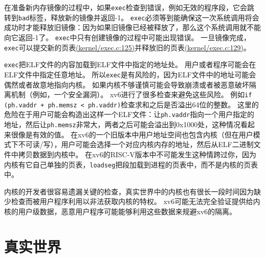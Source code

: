 在准备新内存镜像的过程中，如果\texttt{exec}检查到错误，例如无效的程序段，它会跳转到\texttt{bad}标签，释放新的镜像并返回-1。
\texttt{exec}必须等到能确保这一次系统调用将会成功时才能释放旧镜像：因为如果旧镜像已经被释放了，那么这个系统调用就不能向它返回-1了。
\texttt{exec}中只有创建镜像的过程中可能出现错误。
一旦镜像完成，\texttt{exec}可以提交新的页表\href{https://github.com/mit-pdos/xv6-riscv/blob/riscv//kernel/exec.c#L125}{(kernel/exec.c:125)}并释放旧的页表\href{https://github.com/mit-pdos/xv6-riscv/blob/riscv//kernel/exec.c#L129}{(kernel/exec.c:129)}。

\texttt{exec}把ELF文件的内容加载到ELF文件中指定的地址处。
用户或者程序可能会在ELF文件中指定任意地址。
所以\texttt{exec}是有风险的，因为ELF文件中的地址可能会偶然或者故意地指向内核。
如果内核不够谨慎可能会导致崩溃或者被恶意破坏隔离机制（例如，一个安全漏洞）。
xv6进行了很多检查来避免这些风险。
例如\texttt{if (ph.vaddr + ph.memsz < ph.vaddr)}检查求和之后是否溢出64位的整数。
这里的危险在于用户可能会构造出这样一个ELF文件：让\texttt{ph.vaddr}指向一个用户指定的地址，然后让\texttt{ph.memsz}非常大，两者之后可能会溢出到0x1000处，这种情况看起来很像是有效的值。
在xv6的一个旧版本中用户地址空间也包含内核（但在用户模式下不可读/写），用户可能会选择一个对应内核内存的地址，然后从ELF二进制文件中拷贝数据到内核中。
在xv6的RISC-V版本中不可能发生这种情跨过你，因为内核有它自己单独的页表，\texttt{loadseg}把段加载到进程的页表中，而不是内核的页表中。

内核的开发者很容易遗漏关键的检查，真实世界中的内核也有很长一段时间因为缺少检查而被用户程序利用以非法获取内核的特权。
xv6可能无法完全验证提供给内核的用户级数据，恶意用户程序可能能够利用这些数据来规避xv6的隔离。

\section{真实世界}

